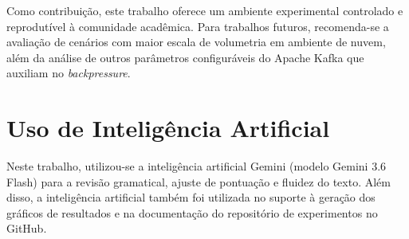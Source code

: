 \documentclass[12pt]{article}
\begin{document}
  Como contribuição, este trabalho oferece um ambiente experimental controlado e reprodutível à comunidade acadêmica. Para trabalhos futuros, recomenda-se a avaliação de cenários com maior escala de volumetria em ambiente de nuvem, além da análise de outros parâmetros configuráveis do Apache Kafka que auxiliam no \textit{backpressure}.

  \section{Uso de Inteligência Artificial}
  Neste trabalho, utilizou-se a inteligência artificial Gemini (modelo Gemini 3.6 Flash) para a revisão gramatical, ajuste de pontuação e  fluidez do texto. Além disso, a inteligência artificial também foi utilizada no suporte à geração dos gráficos de resultados e na documentação do repositório de experimentos no GitHub.

  
  
\end{document}
